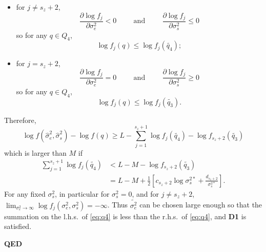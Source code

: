 \documentclass[ejs]{imsart}
\newcommand{\RL}{f}
\newcommand{\logRL}{\log\RL}
\newcommand{\sigssq}{\sigma_s^2}
\newcommand{\sigesq}{\sigma_e^2}
\newcommand{\sshat}{\hat\sigma^2_e,\hat\sigma^2_s}
\begin{document}
\begin{itemize}
  \begin{itemize}
  \item for $j \ne s_z+2$,
    \begin{equation*}
      \frac{\partial\logRL_j}{\partial\sigesq} < 0 \hspace{1cm} \text{and} \hspace{1cm}
      \frac{\partial\logRL_j}{\partial\sigssq} \le 0
    \end{equation*}
    so for any $q \in Q_4$,
    \begin{equation*}
      \logRL_j(q) \le \logRL_j(\widetilde{q_4});
    \end{equation*}
  \item  for $j = s_z+2$,
    \begin{equation*}
      \frac{\partial\logRL_j}{\partial\sigesq} = 0 \hspace{1cm} \text{and} \hspace{1cm}
      \frac{\partial\logRL_j}{\partial\sigssq} \ge 0
    \end{equation*}
    so for any $q \in Q_4$,
    \begin{equation*}
      \logRL_j(q) \le \logRL_j(\widetilde{q_3}).
    \end{equation*}
  \end{itemize}
  Therefore,
  \begin{equation*}
	\logRL(\sshat) - \logRL(q) \ge L - \sum_{j=1}^{s_z+1} \logRL_j(\widetilde{q_4}) - \logRL_{s_z+2}(\widetilde{q_3})
  \end{equation*}
  which is larger than $M$ if
  \begin{equation}
  \label{eq:q4}
    \begin{split}
      \sum_{j=1}^{s_z+1} \logRL_j(\widetilde{q_4})
        &< L - M - \logRL_{s_z+2}(\widetilde{q_3})\\
        &= L - M + \frac{1}{2} \left[ c_{s_z+2}\log\sigma_s^{2*} + \frac{d_{s_z+2}}{\sigma_s^{2*}}\right].
    \end{split}
  \end{equation}
  For any fixed $\sigssq$, in particular for $\sigssq=0$, and for $j \ne s_z+2$,\\ $\lim_{\sigesq \rightarrow \infty}
  \logRL_j(\sigesq,\sigssq) = -\infty$.  Thus $\widetilde{\sigma_e^2}$ can be chosen large enough so that the
  summation on the l.h.s.~of \eqref{eq:q4} is less than the r.h.s.~of \eqref{eq:q4}, and  \textbf{D1} is satisfied.\end{itemize}  
\textbf{QED}\\
\end{document}

